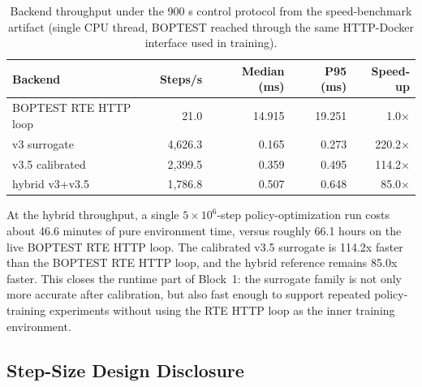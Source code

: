\documentclass[11pt,a4paper]{article}
\begin{document}
\begin{table}[H]
\centering
\small
\caption{Backend throughput under the 900 s control protocol from the speed-benchmark artifact (single CPU thread, BOPTEST reached through the same HTTP-Docker interface used in training).}
\label{tab:speed}
\begin{tabular}{lrrrr}
\toprule
Backend & Steps/s & Median (ms) & P95 (ms) & Speed-up \\
\midrule
BOPTEST RTE HTTP loop & 21.0 & 14.915 & 19.251 & 1.0$\times$ \\
v3 surrogate & 4,626.3 & 0.165 & 0.273 & 220.2$\times$ \\
v3.5 calibrated & 2,399.5 & 0.359 & 0.495 & 114.2$\times$ \\
hybrid v3+v3.5 & 1,786.8 & 0.507 & 0.648 & 85.0$\times$ \\
\bottomrule
\end{tabular}
\end{table}

At the hybrid throughput, a single \(5\times10^6\)-step policy-optimization run costs about 46.6 minutes of pure environment time, versus roughly 66.1 hours on the live BOPTEST RTE HTTP loop. The calibrated v3.5 surrogate is 114.2x faster than the BOPTEST RTE HTTP loop, and the hybrid reference remains 85.0x faster. This closes the runtime part of Block~1: the surrogate family is not only more accurate after calibration, but also fast enough to support repeated policy-training experiments without using the RTE HTTP loop as the inner training environment.

\subsection{Step-Size Design Disclosure}
\label{ssec:block1-stepsize}
\end{document}
